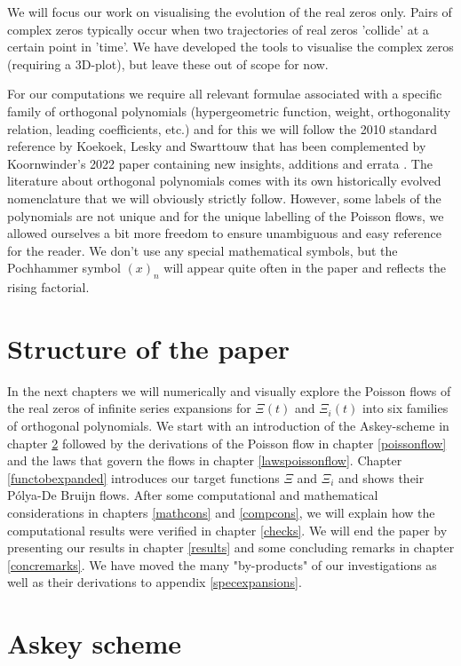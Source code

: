 \documentclass[a4paper,11pt,twoside]{amsart}
\begin{document}
We will focus our work on visualising the evolution of the real zeros only. Pairs of complex zeros typically occur when two trajectories of real zeros 'collide' at a certain point in 'time'. We have developed the tools to visualise the complex zeros (requiring a 3D-plot), but leave these out of scope for now. 

For our computations we require all relevant formulae  associated with a specific family of orthogonal polynomials (hypergeometric function, weight, orthogonality relation, leading coefficients, etc.) and for this we will follow the 2010 standard reference by Koekoek, Lesky and Swarttouw \cite{koe} that has been complemented by Koornwinder's 2022 paper containing new insights, additions and errata \cite{koesup}. The literature about orthogonal polynomials comes with its own historically evolved nomenclature that we will obviously strictly follow. However, some labels of the polynomials are not unique and for the unique labelling of the Poisson flows, we allowed ourselves a bit more freedom to ensure unambiguous and easy reference for the reader. We don't use any special mathematical symbols, but the Pochhammer symbol $(x)_n$ will appear quite often in the paper and reflects the rising factorial.

\section{Structure of the paper}
In the next chapters we will numerically and visually explore the Poisson flows of the real zeros of infinite series expansions for $\Xi(t)$ and $\Xi_i(t)$ into six families of orthogonal polynomials. We start with an introduction of the Askey-scheme in chapter \ref{askeyscheme} followed by the derivations of the Poisson flow in chapter \ref{poissonflow} and the laws that govern the flows in chapter \ref{lawspoissonflow}. Chapter \ref{functobexpanded} introduces our target functions $\Xi$ and $\Xi_i$ and shows their Pólya-De Bruijn flows. After some computational and mathematical considerations in chapters \ref{mathcons} and \ref{compcons}, we will explain how the computational results were verified in chapter \ref{checks}. We will end the paper by presenting our results in chapter \ref{results} and some concluding remarks in chapter \ref{concremarks}. We have moved the many "by-products" of our investigations as well as their derivations to appendix \ref{specexpansions}. 

\pagebreak
\section{Askey scheme}\label{askeyscheme}
\end{document}
